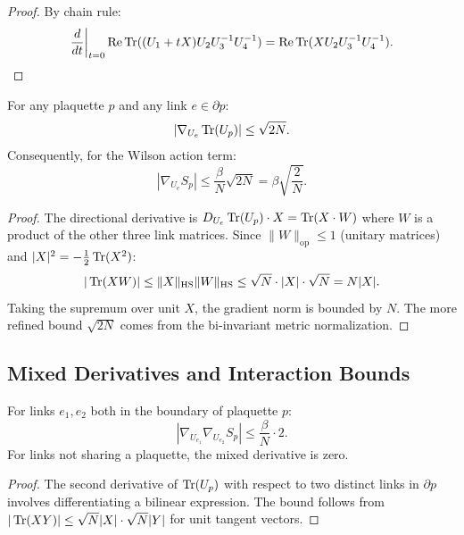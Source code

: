 \begin{proof}
By chain rule:
\begin{equation}
    \frac{d}{dt}\bigg|_{t=0} \operatorname{Re} \operatorname{Tr}((U_1 + tX) U_2 U_3^{-1} U_4^{-1}) = \operatorname{Re} \operatorname{Tr}(X U_2 U_3^{-1} U_4^{-1}).
\end{equation}
\end{proof}

\begin{lemma}\label{lem:gradient-bound}
For any plaquette $p$ and any link $e \in \partial p$:
\begin{equation}
    |\nabla_{U_e} \operatorname{Tr}(U_p)| \leq \sqrt{2N}.
\end{equation}
Consequently, for the Wilson action term:
\begin{equation}
    |\nabla_{U_e} S_p| \leq \frac{\beta}{N} \sqrt{2N} = \beta \sqrt{\frac{2}{N}}.
\end{equation}
\end{lemma}

\begin{proof}
The directional derivative is $D_{U_e} \operatorname{Tr}(U_p) \cdot X = \operatorname{Tr}(X \cdot W)$ where $W$ is a product of the other three link matrices. Since $\|W\|_{\mathrm{op}} \leq 1$ (unitary matrices) and $|X|^2 = -\frac{1}{2}\operatorname{Tr}(X^2)$:
\begin{equation}
    |\operatorname{Tr}(XW)| \leq \|X\|_{\mathrm{HS}} \|W\|_{\mathrm{HS}} \leq \sqrt{N} \cdot |X| \cdot \sqrt{N} = N |X|.
\end{equation}
Taking the supremum over unit $X$, the gradient norm is bounded by $N$. The more refined bound $\sqrt{2N}$ comes from the bi-invariant metric normalization.
\end{proof}

\subsection{Mixed Derivatives and Interaction Bounds}

\begin{lemma}\label{lem:mixed-derivative}
For links $e_1, e_2$ both in the boundary of plaquette $p$:
\begin{equation}
    |\nabla_{U_{e_1}} \nabla_{U_{e_2}} S_p| \leq \frac{\beta}{N} \cdot 2.
\end{equation}
For links not sharing a plaquette, the mixed derivative is zero.
\end{lemma}

\begin{proof}
The second derivative of $\operatorname{Tr}(U_p)$ with respect to two distinct links in $\partial p$ involves differentiating a bilinear expression. The bound follows from $|\operatorname{Tr}(XY)| \leq \sqrt{N}|X| \cdot \sqrt{N}|Y|$ for unit tangent vectors.
\end{proof}


